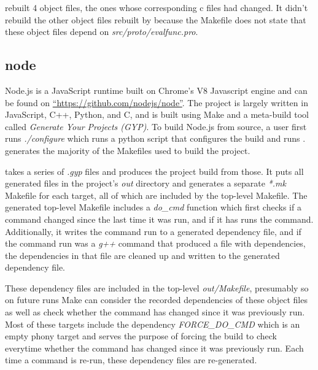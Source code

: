   \Make rebuilt 4 object files, the ones whose corresponding c files had changed.  It didn't rebuild the other object files rebuilt by \Rattle because the Makefile does not state that these object files
  depend on \emph{src/proto/evalfunc.pro}.

\subsection{node}

Node.js is a JavaScript runtime built on Chrome's V8 Javascript engine and can be found on \hyperref[github]{``https://github.com/nodejs/node''}.  The project is largely written in JavaScript, C++, Python, and C, and is built using Make and a meta-build tool called \emph{Generate Your Projects (GYP)}.  To build Node.js from source, a user first runs \emph{./configure} which runs a python script that configures the build and runs \GYP.  \GYP generates the majority of the Makefiles used to build the project.

\GYP takes a series of \emph{.gyp} files and produces the project build from those.  It puts all generated files in the project's \emph{out} directory and generates a separate \emph{*.mk} Makefile for each target, all of which are included by the top-level Makefile.  The generated top-level Makefile includes a \emph{do\_cmd} function which first checks if a command changed since the last time it was run, and if it has runs the command.  Additionally, it writes the command run to a generated dependency file, and if the command run was a \emph{g++} command that produced a file with dependencies, the dependencies in that file are cleaned up and written to the generated dependency file.

These dependency files are included in the top-level \emph{out/Makefile}, presumably so on future runs Make can consider the recorded dependencies of these object files as well as check whether the command has changed since it was previously run.  Most of these targets include the dependency \emph{FORCE\_DO\_CMD} which is an empty phony target and serves the purpose of forcing the build to check everytime whether the command has changed since it was previously run. Each time a command is re-run, these dependency files are re-generated.


